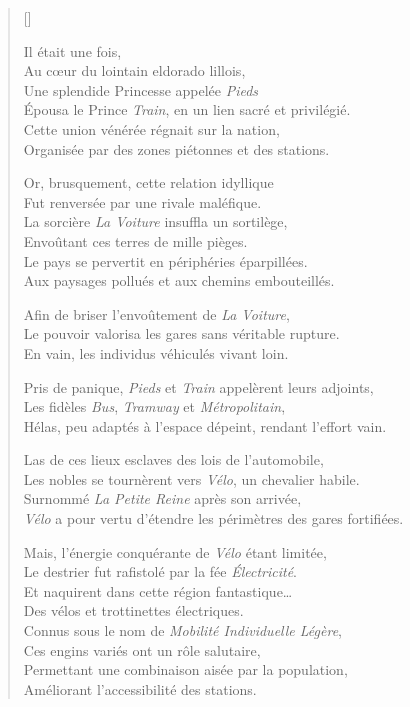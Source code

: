 \settowidth{\versewidth}{And objects at rest tended to remain at rest}
\begin{verse}[\versewidth]

Il était une fois,\\
Au cœur du lointain eldorado lillois,\\
Une splendide Princesse appelée \textsl{Pieds}\\
Épousa le Prince \textsl{Train}, en un lien sacré et privilégié.\\
Cette union vénérée régnait sur la nation,\\
Organisée par des zones piétonnes et des stations.

Or, brusquement, cette relation idyllique\\
Fut renversée par une rivale maléfique.\\
La sorcière \textsl{La Voiture} insuffla un sortilège,\\
Envoûtant ces terres de mille pièges.\\
Le pays se pervertit en périphéries éparpillées.\\
Aux paysages pollués et aux chemins embouteillés.

Afin de briser l’envoûtement de \textsl{La Voiture},\\
Le pouvoir valorisa les gares sans véritable rupture.\\
En vain, les individus véhiculés vivant loin.

Pris de panique, \textsl{Pieds} et \textsl{Train} appelèrent leurs adjoints,\\
Les fidèles \textsl{Bus}, \textsl{Tramway} et \textsl{Métropolitain},\\
Hélas, peu adaptés à l’espace dépeint, rendant l'effort vain.

Las de ces lieux esclaves des lois de l’automobile,\\
Les nobles se tournèrent vers \textsl{Vélo}, un chevalier habile.\\
Surnommé \textsl{La Petite Reine} après son arrivée,\\
\textsl{Vélo} a pour vertu d'étendre les périmètres des gares fortifiées.

Mais, l’énergie conquérante de \textsl{Vélo} étant limitée,\\
Le destrier fut rafistolé par la fée \textsl{Électricité}.\\
Et naquirent dans cette région fantastique\dots\\
Des vélos et trottinettes électriques.\\
Connus sous le nom de \textsl{Mobilité Individuelle Légère},\\
Ces engins variés ont un rôle salutaire,\\
Permettant une combinaison aisée par la population,\\
Améliorant l’accessibilité des stations.


\end{verse}
